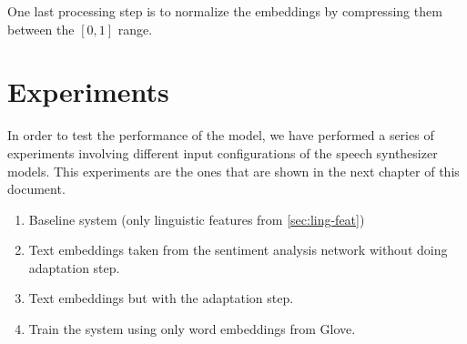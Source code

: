 One last processing step is to normalize the embeddings by compressing them between the $[0, 1]$ range.

\section{Experiments} \label{sec:systems}

In order to test the performance of the model, we have performed a series of experiments involving different input configurations of the speech synthesizer models. This experiments are the ones that are shown in the next chapter of this document. %

\begin{enumerate}
    \item Baseline system (only linguistic features from \ref{sec:ling-feat})
    \item Text embeddings taken from the sentiment analysis network without doing adaptation step.
    \item Text embeddings but with the adaptation step.
    \item Train the system using only word embeddings from Glove.
\end{enumerate}
